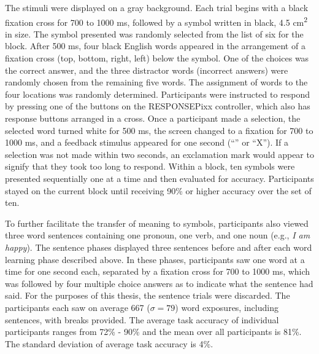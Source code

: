 The stimuli were displayed on a gray background.  Each trial begins with a 
black fixation cross for 700 to 1000 ms, followed by a symbol written in black, 
4.5 cm\textsuperscript{2} in size. The symbol presented was randomly selected 
from the list of six for the block. After 500 ms, four black English words 
appeared in the arrangement of a fixation cross (top, bottom, right, left) 
below the symbol. One of the choices was the correct answer, and the three 
distractor words (incorrect answers) were randomly chosen from the remaining 
five words. The assignment of words to the four locations was randomly 
determined. Participants were instructed to respond by pressing one of the 
buttons on the RESPONSEPixx controller, which also has response buttons 
arranged in a cross. Once a participant made a selection, the selected word 
turned white for 500 ms, the screen changed to a fixation for 700 to 1000 ms, 
and a feedback stimulus appeared for one second (``\CheckmarkBold'' or ``X'').  
If a selection was not made within two seconds, an exclamation mark would 
appear to signify that they took too long to respond. Within a block, ten 
symbols were presented sequentially one at a time and then evaluated for 
accuracy. Participants stayed on the current block until receiving 90\% or 
higher accuracy over the set of ten.
  
To further facilitate the transfer of meaning to symbols, participants also 
viewed three word sentences containing one pronoun, one verb, and one noun 
(e.g., \emph{I am happy}). The sentence phases displayed three sentences before 
and after each word learning phase described above. In these phases, 
participants saw one word at a time for one second each, separated by a 
fixation cross for 700 to 1000 ms, which was followed by four multiple choice 
answers as to indicate what the sentence had said. For the purposes of this 
thesis, the sentence trials were discarded. The participants each saw on 
average 667 ($\sigma = 79$) word exposures, including sentences, with breaks 
provided.  The average task accuracy of individual participants ranges from 
72\% - 90\% and the mean over all participants is 81\%. The standard deviation 
of average task accuracy is 4\%.
